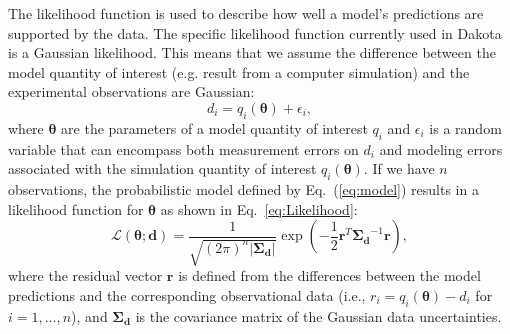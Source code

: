 The likelihood function is used to describe how well a model's
predictions are supported by the data.  
The specific likelihood function currently used in Dakota is a Gaussian
likelihood. This means that we assume the difference between the model quantity of interest
(e.g. result from a computer simulation) and the experimental observations are Gaussian:
\begin{equation}
d_i = q_i(\boldsymbol{\theta}) + \epsilon_i, \label{eq:model}
\end{equation}
where $\boldsymbol{\theta}$ are the parameters of a model quantity of interest $q_i$ and
$\epsilon_i$ is a random variable that can encompass both measurement
errors on $d_i$ and modeling errors associated with the simulation quantity of interest 
$q_i(\boldsymbol{\theta})$. %
If we have $n$ observations, the probabilistic model defined by 
Eq.~(\ref{eq:model}) results in a likelihood function for $\boldsymbol{\theta}$ 
as shown in Eq.~\ref{eq:Likelihood}:
\begin{equation}
\mathcal{L}(\boldsymbol{\theta;d}) = 
\frac{1}{\sqrt{(2\pi)^n |\boldsymbol{\Sigma_d}|}}
\exp \left(
-\frac{1}{2} \boldsymbol{r}^T \boldsymbol{\Sigma_d}^{-1} \boldsymbol{r} 
\right), \label{eq:Likelihood}
\end{equation}
where the residual vector $\boldsymbol{r}$ is defined from the
differences between the model predictions and the corresponding
observational data (i.e., $r_i = q_i(\boldsymbol{\theta}) - d_i$ for $i = 1,\dots,n$), and
$\boldsymbol{\Sigma_d}$ is the covariance matrix of the Gaussian data
uncertainties. %

